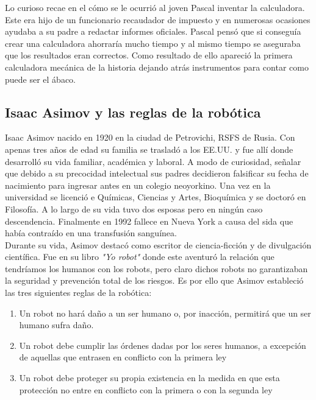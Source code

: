 Lo curioso recae en el cómo se le ocurrió al joven Pascal inventar la calculadora. Este era hijo de un funcionario recaudador de impuesto y en numerosas ocasiones ayudaba a su padre a redactar informes oficiales. Pascal pensó que si conseguía crear una calculadora ahorraría mucho tiempo y al mismo tiempo se aseguraba que los resultados eran correctos. Como resultado de ello apareció la primera calculadora mecánica de la historia dejando atrás instrumentos para contar como puede ser el ábaco.





\subsection{Isaac Asimov y las reglas de la robótica}

Isaac Asimov nacido en 1920 en la ciudad de Petrovichi, RSFS de Rusia. Con apenas tres años de edad su familia se trasladó a los EE.UU. y fue allí donde desarrolló su vida familiar, académica y laboral. A modo de curiosidad, señalar que debido a su precocidad intelectual sus padres decidieron falsificar su fecha de nacimiento para ingresar antes en un colegio neoyorkino. Una vez en la universidad se licenció e Químicas, Ciencias y Artes, Bioquímica y se doctoró en Filosofía. A lo largo de su vida tuvo dos esposas pero en ningún caso descendencia. Finalmente en 1992 fallece en Nueva York a causa del sida que había contraído en una transfusión sanguínea.\\

Durante su vida, Asimov destacó como escritor de ciencia-ficción y de divulgación científica. Fue en su libro \textit{"Yo robot"} donde este aventuró la relación que tendríamos los humanos con los robots, pero claro dichos robots no garantizaban la seguridad y prevención total de los riesgos. Es por ello que Asimov estableció las tres siguientes reglas de la robótica:

\begin{enumerate}
\item Un robot no hará daño a un ser humano o, por inacción, permitirá que un ser humano sufra daño.
\item Un robot debe cumplir las órdenes dadas por los seres humanos, a excepción de aquellas que entrasen en conflicto con la primera ley
\item Un robot debe proteger su propia existencia en la medida en que esta protección no entre en conflicto con la primera o con la segunda ley
\end{enumerate}

